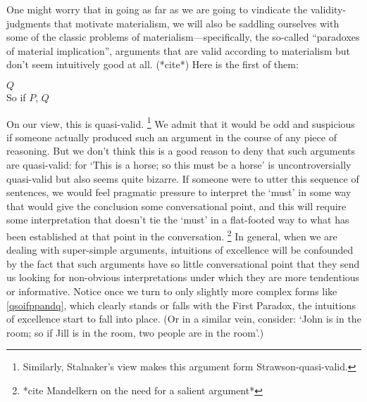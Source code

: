 \documentclass[If.tex]{subfiles}
\begin{document}

One might worry that in going as far as we are going to vindicate the validity-judgments that motivate materialism, we will also be saddling ourselves with some of the classic problems of materialism---specifically, the so-called “paradoxes of material implication”, arguments that are valid according to materialism but don't seem intuitively good at all.  (*cite*)  Here is the first of them:
\begin{prop}
	\parbox[t]{\linewidth}{$Q$\\
	So if $P$, $Q$}
\end{prop}
On our view, this is quasi-valid.%
\footnote{Similarly, Stalnaker's view makes this argument form Strawson-quasi-valid.}
We admit that it would be odd and suspicious if someone actually produced such an argument in the course of any piece of reasoning. But we don't think this is a good reason to deny that such arguments are quasi-valid: for ‘This is a horse; so this must be a horse’ is uncontroversially quasi-valid but also seems quite bizarre. If someone were to utter this sequence of sentences, we would feel pragmatic pressure to interpret the ‘must’ in some way that would give the conclusion some conversational point, and this will require some interpretation that doesn't tie the ‘must’ in a flat-footed way to what has been established at that point in the conversation.%
\footnote{*cite Mandelkern on the need for a salient argument*} 
In general, when we are dealing with super-simple arguments, intuitions of excellence will be confounded by the fact that such arguments have so little conversational point that they send us looking for non-obvious interpretations under which they are more tendentious or informative. Notice once we turn to only slightly more complex forms like \ref{qsoifppandq}, which clearly stands or falls with the First Paradox, the intuitions of excellence start to fall into place.  (Or in a similar vein, consider: ‘John is in the room; so if Jill is in the room, two people are in the room’.)
\end{document}
